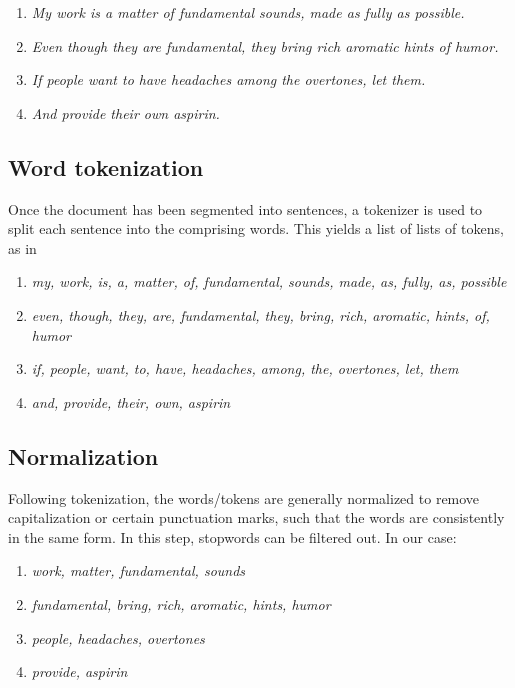 \begin{enumerate}
    \item \textit{My work is a matter of fundamental sounds, made as fully as possible.}
    \item \textit{Even though they are fundamental, they bring rich aromatic hints of humor.}
    \item \textit{If people want to have headaches among the overtones, let them.}
    \item \textit{And provide their own aspirin.}
\end{enumerate}

\subsection{Word tokenization} 

Once the document has been segmented into sentences, a tokenizer is used to split each sentence into the comprising words. This yields a list of lists of tokens, as in
\begin{enumerate}
    \item \textit{my, work, is, a, matter, of, fundamental, sounds, made, as, fully, as, possible}
    \item \textit{even, though, they, are, fundamental, they, bring, rich, aromatic, hints, of, humor}
    \item \textit{if, people, want, to, have, headaches, among, the, overtones, let, them}
    \item \textit{and, provide, their, own, aspirin}
\end{enumerate}

\subsection{Normalization}

Following tokenization, the words/tokens are generally normalized to remove capitalization or certain punctuation marks, such that the words are consistently in the same form. In this step, stopwords can be filtered out. In our case:
\begin{enumerate}
    \item \textit{work, matter, fundamental, sounds}
    \item \textit{fundamental, bring, rich, aromatic, hints, humor}
    \item \textit{people, headaches, overtones}
    \item \textit{provide, aspirin}
\end{enumerate}

